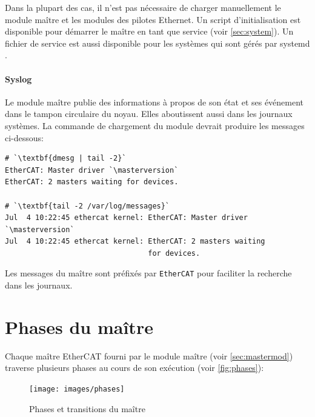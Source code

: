 \documentclass[a4paper,12pt,BCOR=6mm,bibtotoc,idxtotoc]{scrbook}
\newcommand{\masterversion}{1.5.2}
\begin{document}
Dans la plupart des cas, il n'est pas n\'ecessaire de charger
manuellement le module ma\^itre et les modules des pilotes Ethernet.
Un script d'initialisation est disponible pour d\'emarrer le ma\^itre
en tant que service (voir \autoref{sec:system}). Un fichier de service
est aussi disponible pour les syst\`emes qui sont g\'er\'es par
systemd \cite{systemd}.

\paragraph{Syslog}

Le module ma\^itre publie des informations \`a propos de son \'etat et ses
\'ev\'enement dans le tampon circulaire du noyau. Elles aboutissent aussi
dans les journaux syst\`emes. La commande de chargement du module
devrait produire les messages ci-dessous:

\begin{lstlisting}
# `\textbf{dmesg | tail -2}`
EtherCAT: Master driver `\masterversion`
EtherCAT: 2 masters waiting for devices.

# `\textbf{tail -2 /var/log/messages}`
Jul  4 10:22:45 ethercat kernel: EtherCAT: Master driver `\masterversion`
Jul  4 10:22:45 ethercat kernel: EtherCAT: 2 masters waiting
                                 for devices.
\end{lstlisting}

Les messages du ma\^itre sont pr\'efix\'es par \lstinline+EtherCAT+ pour
faciliter la recherche dans les journaux.


\section{Phases du ma\^itre}

Chaque ma\^itre EtherCAT fourni par le module ma\^itre (voir
\autoref{sec:mastermod}) traverse plusieurs phases au cours de son
ex\'ecution (voir \autoref{fig:phases}):

\begin{figure}[htbp]
  \centering
  \texttt{[image: images/phases]}
  \caption{Phases et transitions du ma\^itre}
  \label{fig:phases}
\end{figure}
\end{document}
